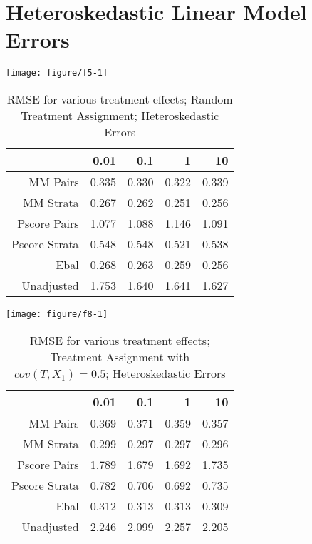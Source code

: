 \documentclass[11pt]{article}\usepackage[]{graphicx}\usepackage[]{color}
\makeatletter
\def\maxwidth{ %
  \ifdim\Gin@nat@width>\linewidth
    \linewidth
  \else
    \Gin@nat@width
  \fi
}
\newenvironment{knitrout}{}{} %
\makeatother
\begin{document}
\section{Heteroskedastic Linear Model Errors}
\begin{knitrout}
\color{fgcolor}

{\centering \texttt{[image: figure/f5-1]} 

}



\end{knitrout}
\begin{table}[ht]
\centering
\begin{tabular}{rrrrr}
  \hline
 & 0.01 & 0.1 & 1 & 10 \\ 
  \hline
MM Pairs & 0.335 & 0.330 & 0.322 & 0.339 \\ 
  MM Strata & 0.267 & 0.262 & 0.251 & 0.256 \\ 
  Pscore Pairs & 1.077 & 1.088 & 1.146 & 1.091 \\ 
  Pscore Strata & 0.548 & 0.548 & 0.521 & 0.538 \\ 
  Ebal & 0.268 & 0.263 & 0.259 & 0.256 \\ 
  Unadjusted & 1.753 & 1.640 & 1.641 & 1.627 \\ 
   \hline
\end{tabular}
\caption{RMSE for various treatment effects; Random Treatment Assignment; Heteroskedastic Errors} 
\label{tab:f5}
\end{table}


\begin{knitrout}
\color{fgcolor}

{\centering \texttt{[image: figure/f8-1]} 

}



\end{knitrout}
\begin{table}[ht]
\centering
\begin{tabular}{rrrrr}
  \hline
 & 0.01 & 0.1 & 1 & 10 \\ 
  \hline
MM Pairs & 0.369 & 0.371 & 0.359 & 0.357 \\ 
  MM Strata & 0.299 & 0.297 & 0.297 & 0.296 \\ 
  Pscore Pairs & 1.789 & 1.679 & 1.692 & 1.735 \\ 
  Pscore Strata & 0.782 & 0.706 & 0.692 & 0.735 \\ 
  Ebal & 0.312 & 0.313 & 0.313 & 0.309 \\ 
  Unadjusted & 2.246 & 2.099 & 2.257 & 2.205 \\ 
   \hline
\end{tabular}
\caption{RMSE for various treatment effects; Treatment Assignment with $cov(T, X_1) = 0.5$; Heteroskedastic Errors} 
\label{tab:f8}
\end{table}
\end{document}
